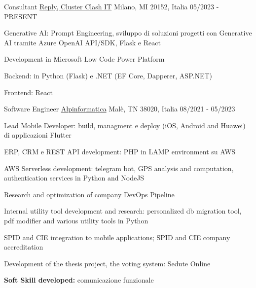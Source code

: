 

\begin{cventries}

  \cventry
    {Consultant} %
    {\href{www.reply.com/}{Reply, Cluster Clash IT}} %
    {Milano, MI 20152, Italia} %
    {05/2023 - PRESENT} %
    {
       \begin{cvitems} %
        \item {Generative AI: Prompt Engineering, sviluppo di soluzioni progetti con Generative AI tramite Azure OpenAI API/SDK, Flask e React}
        \item {Development in Microsoft Low Code Power Platform}
        \item {Backend: in Python (Flask) e .NET (EF Core, Dapperer, ASP.NET)}
        \item {Frontend: React}
       \end{cvitems}
    }

  \cventry
    {Software Engineer} %
    {\href{https://www.alpinformatica.com/}{Alpinformatica}} %
    {Malè, TN 38020, Italia} %
    {08/2021 - 05/2023} %
    {
      \begin{cvitems} %
        \item {Lead Mobile Developer: build, managment e deploy (iOS, Android and Huawei) di applicazioni Flutter}
        \item {ERP, CRM e REST API development: PHP in LAMP environment su AWS}
        \item {AWS Serverless development: telegram bot, GPS analysis and computation, authentication services in Python and NodeJS}
        \item {Research and optimization of company DevOps Pipeline}
        \item {Internal utility tool development and research: personalized db migration tool, pdf modifier and various utility tools in Python}
        \item {SPID and CIE integration to mobile applications; SPID and CIE company accreditation}
        \item {Development of the thesis project, the voting system: Sedute Online}
        \item {\textbf{Soft Skill developed:} comunicazione funzionale}
      \end{cvitems}
    }


\end{cventries}
